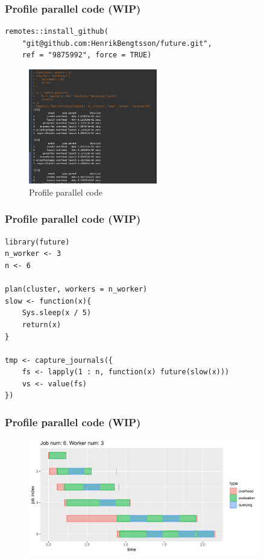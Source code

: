 \documentclass[aspectratio=169,xcolor={dvipsnames,table}]{beamer}
\begin{document}
\begin{frame}[fragile]
  \frametitle{Profile parallel code (WIP)}
  \begin{verbatim}
remotes::install_github(
    "git@github.com:HenrikBengtsson/future.git", 
    ref = "9875992", force = TRUE)
\end{verbatim}
  \begin{figure}[htbp]
    \centering
    \includegraphics[width = 0.5\textwidth]{future_journal}
    \caption{Profile parallel code}
  \end{figure}
\end{frame}

\begin{frame}[fragile]
  \frametitle{Profile parallel code (WIP)}
\begin{verbatim}
library(future)
n_worker <- 3
n <- 6

plan(cluster, workers = n_worker)
slow <- function(x){
    Sys.sleep(x / 5)
    return(x)
}

tmp <- capture_journals({
    fs <- lapply(1 : n, function(x) future(slow(x)))
    vs <- value(fs)  
})
\end{verbatim}
\end{frame}

\begin{frame}
  \frametitle{Profile parallel code (WIP)}
  \begin{figure}[htbp]
    \centering
    \includegraphics[width = 0.9\textwidth]{fig_type}
  \end{figure}
\end{frame}
\end{document}
